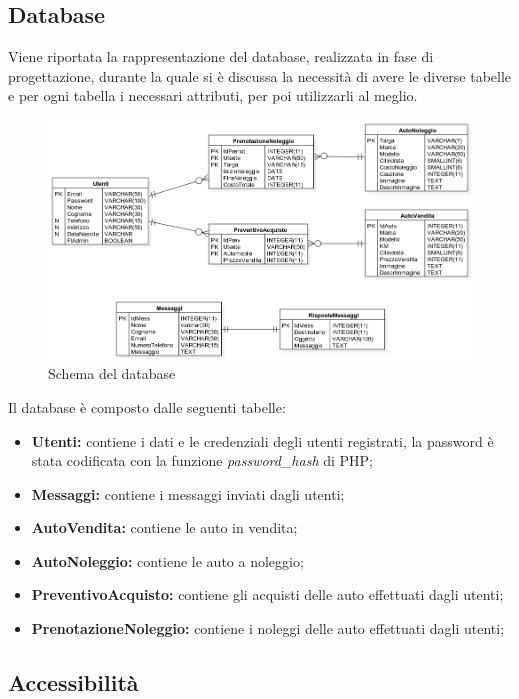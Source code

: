     \subsection{Database}
    Viene riportata la rappresentazione del database, realizzata in fase di progettazione, durante la quale si è discussa la necessità di avere le diverse tabelle e per ogni tabella i necessari attributi, per poi utilizzarli al meglio.
    \begin{figure}[H]
        \centering
        \includegraphics[width=14cm]{./img/database.png}
        \caption{Schema del database}  \label{fig:xray}
    \end{figure}
    Il database è composto dalle seguenti tabelle:
    \begin{itemize}
        \item \textbf{Utenti:} contiene i dati e le credenziali degli utenti registrati, la password è stata codificata con la funzione \textit{password\_hash} di PHP;
        \item \textbf{Messaggi:} contiene i messaggi inviati dagli utenti;
        \item \textbf{AutoVendita:} contiene le auto in vendita;
        \item \textbf{AutoNoleggio:} contiene le auto a noleggio;
        \item \textbf{PreventivoAcquisto:} contiene gli acquisti delle auto effettuati dagli utenti;
        \item \textbf{PrenotazioneNoleggio:} contiene i noleggi delle auto effettuati dagli utenti;
    \end{itemize}

    \subsection{Accessibilità}

\pagebreak